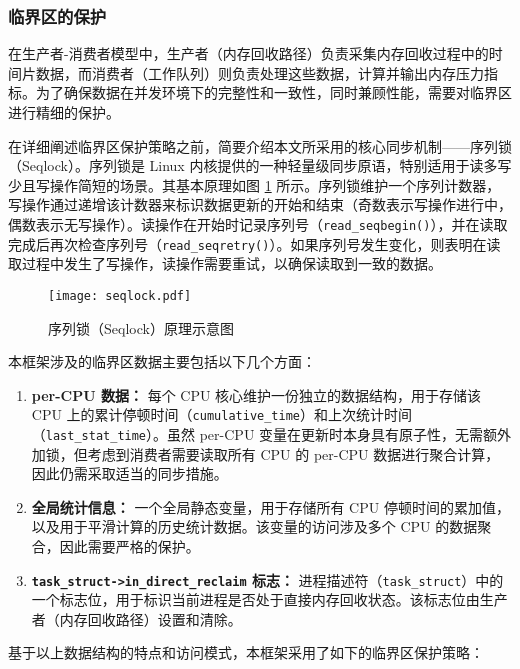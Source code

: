 \subsubsection{临界区的保护}

在生产者-消费者模型中，生产者（内存回收路径）负责采集内存回收过程中的时间片数据，而消费者（工作队列）则负责处理这些数据，计算并输出内存压力指标。为了确保数据在并发环境下的完整性和一致性，同时兼顾性能，需要对临界区进行精细的保护。

在详细阐述临界区保护策略之前，简要介绍本文所采用的核心同步机制——序列锁（Seqlock）。序列锁是 Linux 内核提供的一种轻量级同步原语，特别适用于读多写少且写操作简短的场景。其基本原理如图 \ref{fig:seqlock} 所示。序列锁维护一个序列计数器，写操作通过递增该计数器来标识数据更新的开始和结束（奇数表示写操作进行中，偶数表示无写操作）。读操作在开始时记录序列号（\texttt{read\_seqbegin()}），并在读取完成后再次检查序列号（\texttt{read\_seqretry()}）。如果序列号发生变化，则表明在读取过程中发生了写操作，读操作需要重试，以确保读取到一致的数据。

\begin{figure}[H]
    \centering
    \texttt{[image: seqlock.pdf]}
    \caption{序列锁（Seqlock）原理示意图}
    \label{fig:seqlock}
\end{figure}

本框架涉及的临界区数据主要包括以下几个方面：

\begin{enumerate}
    \item \textbf{per-CPU 数据：} 每个 CPU 核心维护一份独立的数据结构，用于存储该 CPU 上的累计停顿时间（\texttt{cumulative\_time}）和上次统计时间（\texttt{last\_stat\_time}）。虽然 per-CPU 变量在更新时本身具有原子性，无需额外加锁，但考虑到消费者需要读取所有 CPU 的 per-CPU 数据进行聚合计算，因此仍需采取适当的同步措施。

    \item \textbf{全局统计信息：} 一个全局静态变量，用于存储所有 CPU 停顿时间的累加值，以及用于平滑计算的历史统计数据。该变量的访问涉及多个 CPU 的数据聚合，因此需要严格的保护。

    \item \textbf{\texttt{task\_struct->in\_direct\_reclaim} 标志：} 进程描述符（\texttt{task\_struct}）中的一个标志位，用于标识当前进程是否处于直接内存回收状态。该标志位由生产者（内存回收路径）设置和清除。
\end{enumerate}

基于以上数据结构的特点和访问模式，本框架采用了如下的临界区保护策略：

